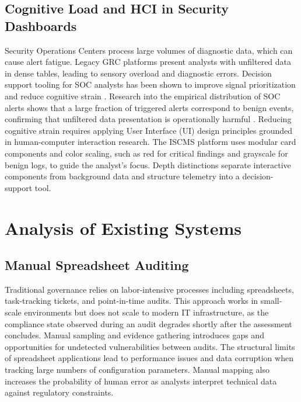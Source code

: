 \subsection{Cognitive Load and HCI in Security Dashboards}
Security Operations Centers process large volumes of diagnostic data, which can cause alert fatigue. Legacy GRC platforms present analysts with unfiltered data in dense tables, leading to sensory overload and diagnostic errors. Decision support tooling for SOC analysts has been shown to improve signal prioritization and reduce cognitive strain \cite{happa2020assessing}. Research into the empirical distribution of SOC alerts shows that a large fraction of triggered alerts correspond to benign events, confirming that unfiltered data presentation is operationally harmful \cite{yang2024true}. Reducing cognitive strain requires applying User Interface (UI) design principles grounded in human-computer interaction research. The ISCMS platform uses modular card components and color scaling, such as red for critical findings and grayscale for benign logs, to guide the analyst's focus. Depth distinctions separate interactive components from background data and structure telemetry into a decision-support tool.

\section{Analysis of Existing Systems}

\subsection{Manual Spreadsheet Auditing}
Traditional governance relies on labor-intensive processes including spreadsheets, task-tracking tickets, and point-in-time audits. This approach works in small-scale environments but does not scale to modern IT infrastructure, as the compliance state observed during an audit degrades shortly after the assessment concludes. Manual sampling and evidence gathering introduces gaps and opportunities for undetected vulnerabilities between audits. The structural limits of spreadsheet applications lead to performance issues and data corruption when tracking large numbers of configuration parameters. Manual mapping also increases the probability of human error as analysts interpret technical data against regulatory constraints.

